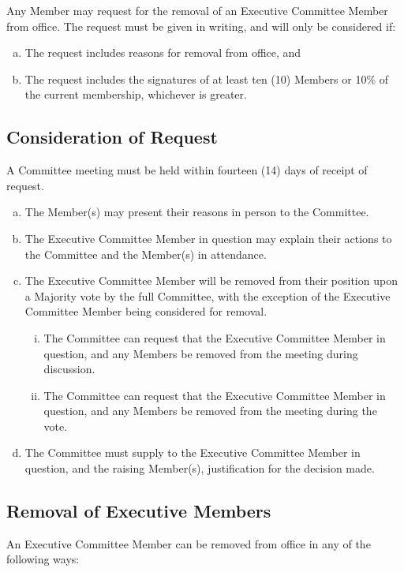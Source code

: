 \documentclass[a4paper,12pt]{article}
\begin{document}
Any Member may request for the removal of an Executive Committee Member from office. The request must be given in writing, and will only be considered if:

\begin{enumerate}[a)]
	\item The request includes reasons for removal from office, and
	\item The request includes the signatures of at least ten (10) Members or 10\% of the current membership, whichever is greater.
\end{enumerate}

\subsection{Consideration of Request}

A Committee meeting must be held within fourteen (14) days of receipt of request.

\begin{enumerate}[a)]
	\item The Member(s) may present their reasons in person to the Committee.
	\item The Executive Committee Member in question may explain their actions to the Committee and the Member(s) in attendance.
	\item The Executive Committee Member will be removed from their position upon a Majority vote by the full Committee, with the exception of the Executive Committee Member being considered for removal.
	\begin{enumerate}[i)]
		\item The Committee can request that the Executive Committee Member in question, and any Members be removed from the meeting during discussion.
		\item The Committee can request that the Executive Committee Member in question, and any Members be removed from the meeting during the vote.
	\end{enumerate}
	\item The Committee must supply to the Executive Committee Member in question, and the raising Member(s), justification for the decision made.
\end{enumerate}

\subsection{Removal of Executive Members}

An Executive Committee Member can be removed from office in any of the following ways:
\end{document}
